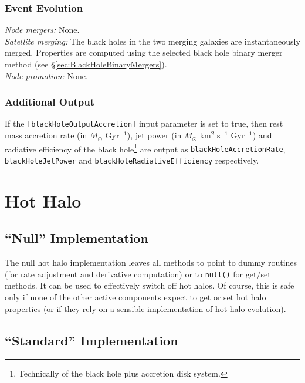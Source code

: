 \subsubsection{Event Evolution}

\noindent\emph{Node mergers:} None.\\

\noindent\emph{Satellite merging:} The black holes in the two merging galaxies are instantaneously merged. Properties are computed using the selected black hole binary merger method (see \S\ref{sec:BlackHoleBinaryMergers}).\\

\noindent\emph{Node promotion:} None.\\

\subsubsection{Additional Output}

If the {\tt [blackHoleOutputAccretion]} input parameter is set to true, then rest mass accretion rate (in $M_\odot$ Gyr$^{-1}$), jet power (in $M_\odot$ km$^2$ s$^{-1}$ Gyr$^{-1}$) and radiative efficiency of the black hole\footnote{Technically of the black hole plus accretion disk system.} are output as {\tt blackHoleAccretionRate}, {\tt blackHoleJetPower} and {\tt blackHoleRadiativeEfficiency} respectively.

\section{Hot Halo}

\subsection{``Null'' Implementation}

The null hot halo implementation leaves all methods to point to dummy routines (for rate adjustment and derivative computation) or to {\tt null()} for get/set methods. It can be used to effectively switch off hot halos. Of course, this is safe only if none of the other active components expect to get or set hot halo properties (or if they rely on a sensible implementation of hot halo evolution).

\subsection{``Standard'' Implementation}

